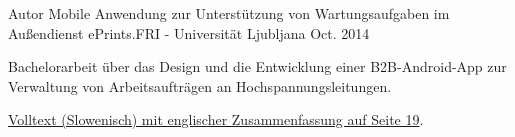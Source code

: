 

\begin{cventries}

\cventry
    {Autor} %
    {Mobile Anwendung zur Unterstützung von Wartungsaufgaben im Außendienst} %
    {ePrints.FRI - Universität Ljubljana} %
    {Oct. 2014} %
    {
      \begin{cvitems} %
         \item {Bachelorarbeit über das Design und die Entwicklung einer B2B-Android-App zur Verwaltung von Arbeitsaufträgen an Hochspannungsleitungen.}
    \item {\href{http://eprints.fri.uni-lj.si/2841/}{Volltext (Slowenisch) mit englischer Zusammenfassung auf Seite 19}.}
      \end{cvitems}
    }

\end{cventries}
